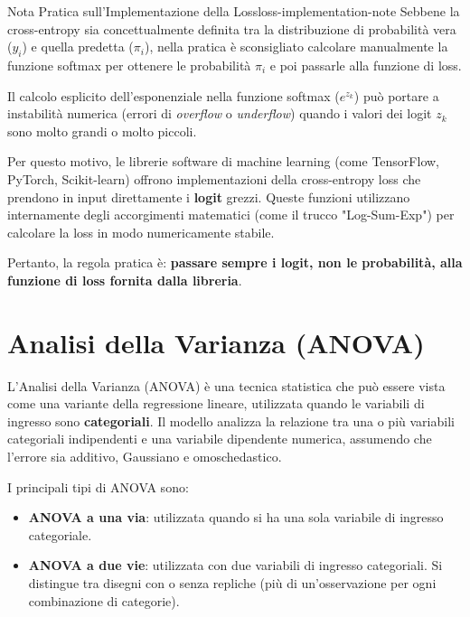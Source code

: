 \begin{nota}{Nota Pratica sull'Implementazione della
Loss}{loss-implementation-note}
Sebbene la cross-entropy sia concettualmente definita tra la distribuzione di
probabilità vera (\(y_i\)) e quella predetta (\(\pi_i\)), nella pratica è
sconsigliato calcolare manualmente la funzione softmax per ottenere le
probabilità \(\pi_i\) e poi passarle alla funzione di loss.

Il calcolo esplicito dell'esponenziale nella funzione softmax (\(e^{z_k}\)) può
portare a instabilità numerica (errori di \textit{overflow} o
\textit{underflow}) quando i valori dei logit \(z_k\) sono molto grandi o molto
piccoli.

Per questo motivo, le librerie software di machine learning (come TensorFlow,
PyTorch, Scikit-learn) offrono implementazioni della cross-entropy loss che
prendono in input direttamente i \textbf{logit} grezzi. Queste funzioni
utilizzano internamente degli accorgimenti matematici (come il trucco
"Log-Sum-Exp") per calcolare la loss in modo numericamente stabile.

Pertanto, la regola pratica è: \textbf{passare sempre i logit, non le
probabilità, alla funzione di loss fornita dalla libreria}.
\end{nota}



\section{Analisi della Varianza (ANOVA)}

L'Analisi della Varianza (ANOVA) è una tecnica statistica che può essere vista
come una variante della regressione lineare, utilizzata quando le variabili di
ingresso sono \textbf{categoriali}. Il modello analizza la relazione tra una o
più variabili categoriali indipendenti e una variabile dipendente numerica,
assumendo che l'errore sia additivo, Gaussiano e omoschedastico.

I principali tipi di ANOVA sono:
\begin{itemize}
    \item \textbf{ANOVA a una via}: utilizzata quando si ha una sola variabile
    di ingresso categoriale.
    \item \textbf{ANOVA a due vie}: utilizzata con due variabili di ingresso
    categoriali. Si distingue tra disegni con o senza repliche (più di
    un'osservazione per ogni combinazione di categorie).
\end{itemize}

